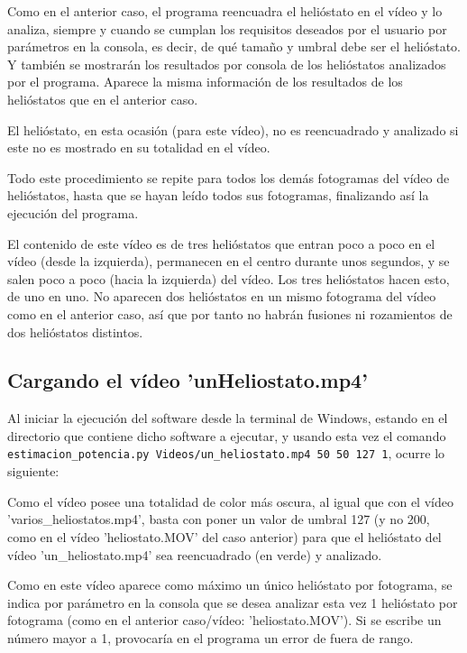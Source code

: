Como en el anterior caso, el programa reencuadra el helióstato en el vídeo y lo analiza, siempre y cuando se cumplan los requisitos deseados por el usuario por parámetros en la consola, es decir, de qué tamaño y umbral debe ser el helióstato. Y también se mostrarán los resultados por consola de los helióstatos analizados por el programa. Aparece la misma información de los resultados de los helióstatos que en el anterior caso.

El helióstato, en esta ocasión (para este vídeo), no es reencuadrado y analizado si este no es mostrado en su totalidad en el vídeo.

Todo este procedimiento se repite para todos los demás fotogramas del vídeo de helióstatos, hasta que se hayan leído todos sus fotogramas, finalizando así la ejecución del programa.

El contenido de este vídeo es de tres helióstatos que entran poco a poco en el vídeo (desde la izquierda), permanecen en el centro durante unos segundos, y se salen poco a poco (hacia la izquierda) del vídeo. Los tres helióstatos hacen esto, de uno en uno. No aparecen dos helióstatos en un mismo fotograma del vídeo como en el anterior caso, así que por tanto no habrán fusiones ni rozamientos de dos helióstatos distintos.

\subsection{Cargando el vídeo 'unHeliostato.mp4'}

Al iniciar la ejecución del software desde la terminal de Windows, estando en el directorio que contiene dicho software a ejecutar, y usando esta vez el comando\\ \verb|estimacion_potencia.py Videos/un_heliostato.mp4 50 50 127 1|, ocurre lo siguiente:

Como el vídeo posee una totalidad de color más oscura, al igual que con el vídeo\\ 'varios\_heliostatos.mp4', basta con poner un valor de umbral 127 (y no 200, como en el vídeo 'heliostato.MOV' del caso anterior) para que el helióstato del vídeo 'un\_heliostato.mp4' sea reencuadrado (en verde) y analizado.

Como en este vídeo aparece como máximo un único helióstato por fotograma, se indica por parámetro en la consola que se desea analizar esta vez 1 helióstato por fotograma (como en el anterior caso/vídeo: 'heliostato.MOV'). Si se escribe un número mayor a 1, provocaría en el programa un error de fuera de rango.


